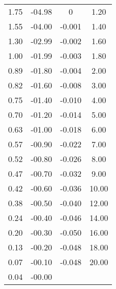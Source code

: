 \begin{table}
\begin{tabular}{c c || c c}
        1.75         &         -04.98  &  0            &           1.20    \\    
        1.55         &         -04.00  &  -0.001       &           1.40    \\    
        1.30         &         -02.99  &  -0.002       &           1.60    \\    
        1.00         &         -01.99  &  -0.003       &           1.80    \\    
        0.89         &         -01.80  &  -0.004       &           2.00    \\    
        0.82         &         -01.60  &  -0.008       &           3.00    \\    
        0.75         &         -01.40  &  -0.010       &           4.00    \\    
        0.70         &         -01.20  &  -0.014       &           5.00    \\    
        0.63         &         -01.00  &  -0.018       &           6.00    \\    
        0.57         &         -00.90  &  -0.022       &           7.00    \\    
        0.52         &         -00.80  &  -0.026       &           8.00    \\    
        0.47         &         -00.70  &  -0.032       &           9.00    \\    
        0.42         &         -00.60  &  -0.036       &          10.00    \\    
        0.38         &         -00.50  &  -0.040       &          12.00    \\    
        0.24         &         -00.40  &  -0.046       &          14.00    \\    
        0.20         &         -00.30  &  -0.050       &          16.00    \\    
        0.13         &         -00.20  &  -0.048       &          18.00    \\    
        0.07         &         -00.10  &  -0.048       &          20.00    \\    
        0.04         &         -00.00  &               &                    \\
        \bottomrule
    \end{tabular}
\end{table}

